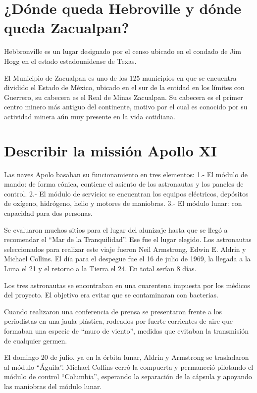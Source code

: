 \documentclass{mylib/reporte}
\begin{document}
\section{¿Dónde queda Hebroville y dónde queda Zacualpan?}

Hebbronville es un lugar designado por el censo ubicado en el condado de Jim Hogg en el estado estadounidense de Texas.


El Municipio de Zacualpan es uno de los 125 municipios en que se encuentra dividido el Estado de México, ubicado en el sur de la entidad en los límites con Guerrero, su cabecera es el Real de Minas Zacualpan. Su cabecera es el primer centro minero más antiguo del continente, motivo por el cual es conocido por su actividad minera aún muy presente en la vida cotidiana.

\section{Describir la missión Apollo XI}

Las naves Apolo basaban su funcionamiento en tres elementos:
1.- El módulo de mando: de forma cónica, contiene el asiento de los astronautas y los paneles de control.
2.- El módulo de servicio: se encuentran los equipos eléctricos, depósitos de oxígeno, hidrógeno, helio y motores de maniobras.
3.- El módulo lunar: con capacidad para dos personas.

Se evaluaron muchos sitios para el lugar del alunizaje hasta que se llegó a recomendar el “Mar de la Tranquilidad”. Ese fue el lugar elegido.
Los astronautas seleccionados para realizar este viaje fueron Neil Armstrong, Edwin E. Aldrin y Michael Collins.
El día para el despegue fue el 16 de julio de 1969, la llegada a la Luna el 21 y el retorno a la Tierra el 24. En total serían 8 días.

Los tres astronautas se encontraban en una cuarentena impuesta por los médicos del proyecto. El objetivo era evitar que se contaminaran con bacterias.

Cuando realizaron una conferencia de prensa se presentaron frente a los periodistas en una jaula plástica, rodeados por fuerte corrientes de aire que formaban una especie de “muro de viento”, medidas que evitaban la transmisión de cualquier germen.

El domingo 20 de julio, ya en la órbita lunar, Aldrin y Armstrong se trasladaron al módulo “Águila”. Michael Collins cerró la compuerta y permaneció pilotando el módulo de control “Columbia”, esperando la separación de la cápsula y apoyando las maniobras del módulo lunar.
\end{document}
